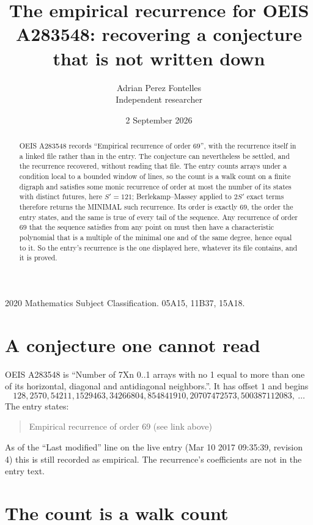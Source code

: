 \documentclass[11pt,a4paper]{article}
\title{The empirical recurrence for OEIS A283548: recovering a conjecture that is not written down}
\author{Adrian Perez Fontelles\\ \small Independent researcher}
\date{2 September 2026}
\theoremstyle{plain}
\theoremstyle{definition}
\begin{document}
\maketitle

\begin{abstract}
OEIS A283548 records ``Empirical recurrence of order $69$'', with the recurrence itself in a
linked file rather than in the entry. The conjecture can nevertheless be settled, and the
recurrence recovered, without reading that file. The entry counts arrays under a condition
local to a bounded window of lines, so the count is a walk count on a finite digraph and
satisfies some monic recurrence of order at most the number of its states with distinct
futures, here $S'=121$; Berlekamp--Massey applied to $2S'$ exact
terms therefore returns the MINIMAL such recurrence. Its order is exactly $69$, the order
the entry states, and the same is true of every tail of the sequence. Any recurrence of order
$69$ that the sequence satisfies from any point on must then have a characteristic
polynomial that is a multiple of the minimal one and of the same degree, hence equal to it. So
the entry's recurrence is the one displayed here, whatever its file contains, and it is
proved.
\end{abstract}

\noindent\small 2020 Mathematics Subject Classification. 05A15, 11B37, 15A18.\normalsize

\section{A conjecture one cannot read}

OEIS A283548 is ``Number of 7Xn 0..1 arrays with no 1 equal to more than one of its horizontal, diagonal and antidiagonal neighbors.''. It has offset $1$ and begins
\[
128, 2570, 54211, 1529463, 34266804, 854841910, 20707472573, 500387112083,\ \dots
\]
The entry states:
\begin{quote}
Empirical recurrence of order 69 (see link above)
\end{quote}
As of the ``Last modified'' line on the live entry (Mar 10 2017 09:35:39, revision 4) this is still
recorded as empirical. The recurrence's coefficients are not in the entry text.

\section{The count is a walk count}
\end{document}
